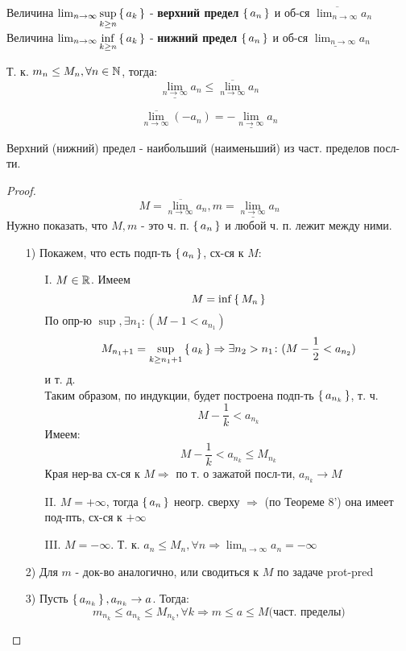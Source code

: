 \begin{definition}
Величина $\lim_{n\to\infty} \underset{k \geq n}{\sup} \set{a_k}$ - \textbf{верхний предел} $\set{a_n}$ и об-ся $\overline{\lim_{n\to\infty}}a_n$ \\

Величина $\lim_{n\to\infty} \underset{k \geq n}{\inf} \set{a_k}$ - \textbf{нижний предел} $\set{a_n}$ и об-ся $\underline{\lim_{n\to\infty}}a_n$
\end{definition}
\begin{note}
Т. к. $m_n \leq M_n, \forall n \in \mathbb{N}$, тогда:
\[
\underline{\lim_{n\to\infty}}a_n \leq \overline{\lim_{n\to\infty}}a_n
\]
\end{note}
\begin{task}
  \label{prot_pred}
\[
\overline{\lim_{n\to\infty}}(-a_n) = -\underline{\lim_{n\to\infty}}a_n
\]
\end{task}
\begin{theorem}
Верхний (нижний) предел - наибольший (наименьший) из част. пределов посл-ти.
\end{theorem}
\begin{proof}
\[
M = \overline{\lim_{n\to\infty}}a_n, m = \underline{\lim_{n\to\infty}}a_n
\]
Нужно показать, что $M, m$ - это ч. п. $\set{a_n}$  и любой ч. п. лежит между ними.
\begin{itemize}
  \item [1) ]  Покажем, что есть подп-ть $\set{a_n}$, сх-ся к $M$:
    \begin{itemize}
      \item [I. ] $M \in \mathbb{R}$. Имеем
        \[
          M = \inf \set{M_n}
        \]
        По опр-ю $\sup, \exists n_1 \colon (M - 1 < a_{n_1})$
        \[
        M_{n_1 + 1} = \underset{k \geq n_1 + 1}{\sup} \set{a_k} \Rightarrow \exists n_2 > n_1 \colon (M - \frac{1}{2} < a_{n_2}) 
        \] и т. д. \\
        Таким образом, по индукции, будет построена подп-ть $\set{a_{n_k}}$, т. ч.
        \[
          M - \frac{1}{k} < a_{n_k}
        \]
        Имеем:
        \[
        M - \frac{1}{k} < a_{n_k} \leq M_{n_k}
        \]
        Края нер-ва сх-ся к $M \Rightarrow $ по т. о зажатой посл-ти, $a_{n_k} \rightarrow M$
      \item [II. ] $M = +\infty$, тогда $\set{a_n}$ неогр. сверху $\Rightarrow$ (по Теореме 8') она имеет под-пть, сх-ся к $+\infty$
      \item [III. ] $M = -\infty$. Т. к. $a_n \leq M_n, \forall n \Rightarrow \lim_{n\to\infty} a_n = -\infty$
    \end{itemize}
  \item [2) ] Для $m$ - док-во аналогично, или сводиться к $M$ по задаче prot-pred
  \item [3) ] Пусть $\set{a_{n_k}}, a_{n_k} \rightarrow a$. Тогда:
    \[
    m_{n_k} \leq a_{n_k} \leq M_{n_k}, \forall k \Rightarrow m \leq a \leq M \text{(част. пределы)}
    \]
\end{itemize}
\end{proof}
